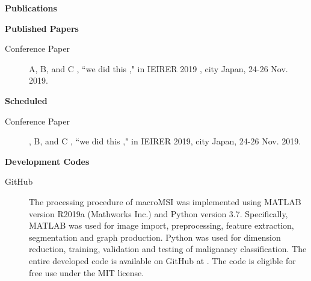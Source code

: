 \pagebreak
\textbf{{\huge Publications}}

\vfill 

\textbf{{\large Published Papers}}
\begin{description}
\item[Conference Paper] A, B, and C , ``we did this ," in IEIRER 2019 , city Japan, 24-26 Nov. 2019.
\end{description}

\vfill 

\textbf{{\large Scheduled}} 
\begin{description}
\item[Conference Paper] , B, and C , ``we did this ," in IEIRER 2019, city Japan, 24-26 Nov. 2019.
\end{description}

\vfill 

\textbf{{\large Development Codes}} \\
\begin{description}
\item[GitHub] The processing procedure of macroMSI was implemented using MATLAB version R2019a (Mathworks Inc.) and Python version 3.7. Specifically, 
MATLAB was used for image import, preprocessing, feature extraction, segmentation and graph production. Python was used for dimension reduction, training, validation and testing of malignancy classification. The entire developed code is available on GitHub at \href{hhttps://foxelas.github.io}{}. The code is eligible for free use under the MIT license.
\end{description}


\vfill 
